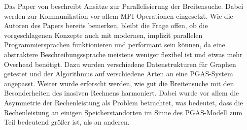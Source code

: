 Das Paper von \cite{Buluc:2011} beschreibt Ansätze zur Parallelisierung der Breitensuche. Dabei werden zur Kommunikation vor allem MPI Operationen eingesetzt. Wie die Autoren des Papers bereits bemerken, bleibt die Frage offen, ob die vorgeschlagenen Konzepte auch mit modernen, implizit parallelen Programmiersprachen funktionieren und performant sein können, da eine abstraktere Beschreibungssprache meistens weniger flexibel ist und etwas mehr Overhead benötigt. Dazu wurden verschiedene Datenstrukturen für Graphen getestet und der Algorithmus auf verschiedene Arten an eine PGAS-System angepasst. Weiter wurde erforscht werden, wie gut die Breitensuche mit den Besonderheiten des inasiven Rechnens harmoniert. Dabei wurde vor allem die Asymmetrie der Rechenleistung als Problem betrachtet, was bedeutet, dass die Rechenleistung an einigen Speicherstandorten im Sinne des PGAS-Modell zum Teil bedeutend größer ist, als an anderen.



